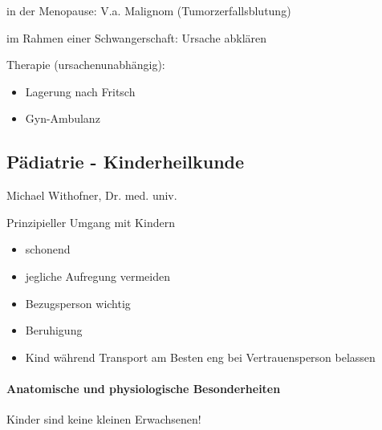 \documentclass{article}
\begin{document}
in der Menopause: V.a. Malignom  (Tumorzerfallsblutung)

im Rahmen einer Schwangerschaft: Ursache  abkl\"aren

Therapie (ursachenunabh\"angig):

\begin{itemize}
\item Lagerung nach Fritsch

\item Gyn-Ambulanz

\end{itemize}
\subsection{P\"adiatrie - Kinderheilkunde}
Michael Withofner, Dr. med. univ.

Prinzipieller Umgang mit Kindern

\begin{itemize}
\item schonend

\item jegliche Aufregung vermeiden

\item Bezugsperson wichtig

\item Beruhigung

\item Kind w\"ahrend Transport am Besten eng bei  Vertrauensperson
belassen 

\end{itemize}
\paragraph[Anatomische und physiologische \ Besonderheiten]{Anatomische
und physiologische  Besonderheiten}
Kinder sind keine kleinen  Erwachsenen!
\end{document}
